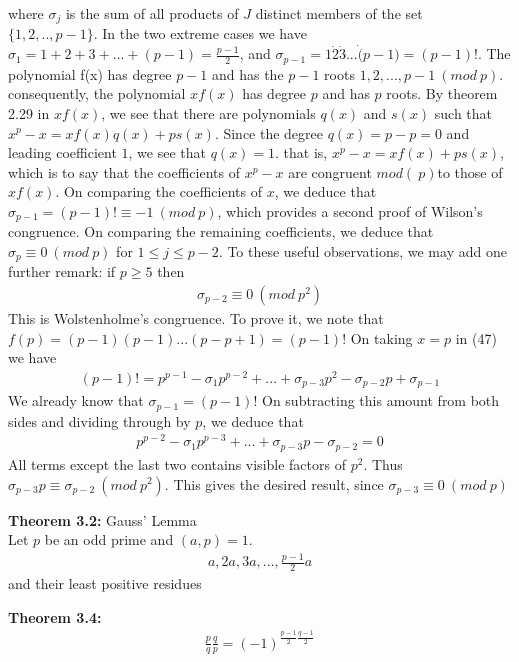 \documentclass[a4paper]{article}
\begin{document}
where $\sigma_j$ is the sum of all products of $J$ distinct members of the set
$\{1,2,..,p-1\}$. In the two extreme cases we have $\sigma_1=1+2+3+...+(p-1)=\frac{p-1}{2}$,
and $\sigma_{p-1}=1\dot2\dot3\dot...\dot(p-1)=(p-1)!$. The polynomial f(x) has degree $p-1$
and has the $p-1$ roots $1,2,...,p-1\ (mod\ p)$. consequently, the polynomial $xf(x)$
has degree $p$ and has $p$ roots. By theorem 2.29 in $xf(x)$, we see that there are polynomials
$q(x)$ and $s(x)$ such that $x^p-x=xf(x)q(x)+ps(x)$.
Since the degree $q(x)=p-p=0$ and leading coefficient $1$, we see that $q(x)=1$.
that is, $x^p-x=xf(x)+ps(x)$, which is to say that the coefficients of $x^p-x$ are congruent
$mod(\ p)$to those of $xf(x)$. On comparing the coefficients of $x$, we deduce that $\sigma_{p-1}=(p-1)!\equiv -1\ (mod\ p)$,
which provides a second proof of Wilson's congruence. On comparing the remaining coefficients,
we deduce that $\sigma_{p}\equiv 0\ (mod\ p)$ for $1\leq j\leq p-2$. To these useful
observations, we may add one further remark: if $p\geq 5$ then
\begin{align*}
    \sigma_{p-2}\equiv 0\ (mod\ p^2)
\end{align*}
This is Wolstenholme's congruence. To prove it, we note that $f(p)=(p-1)(p-1)...(p-p+1)=(p-1)!$
On taking $x=p$ in (47) we have
\begin{align*}
    (p-1)! = p^{p-1}-\sigma_1p^{p-2}+...+\sigma_{p-3}p^2-\sigma_{p-2}p+\sigma_{p-1}
\end{align*}
We already know that $\sigma_{p-1}=(p-1)!$ On subtracting this amount from both sides
and dividing through by $p$, we deduce that
\begin{align*}
    p^{p-2}-\sigma_{1}p^{p-3}+...+\sigma_{p-3}p-\sigma_{p-2}=0
\end{align*}
All terms except the last two contains visible factors of $p^2$. Thus
$\sigma_{p-3}p\equiv \sigma_{p-2}\ (mod\ p^2)$. This gives the desired result, since $\sigma_{p-3}\equiv 0\ (mod\ p)$

\textbf{Theorem 3.2:} Gauss' Lemma\\
Let $p$ be an odd prime and $(a,p)=1$.
\begin{align}
    a,2a,3a,...,\frac{p-1}{2}a
\end{align}
and their least positive residues


\textbf{Theorem 3.4:}\\

\begin{align}
    \frac{p}{q}\frac{q}{p}=(-1)^{\frac{p-1}{2}\frac{q-1}{2}}
\end{align}
\end{document}
